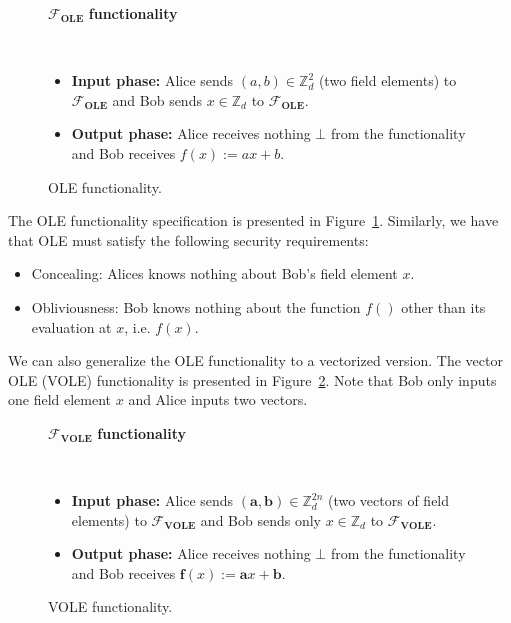 \begin{figure}[h!]
\centering
\begin{tcolorbox}
                        
    \centerline{$\mathcal{F}_{\textbf{OLE}}$ \textbf{functionality}}
            
    \
    
    \begin{itemize}
    		\item \textbf{Input phase:} Alice sends $(a,b)\in\mathbb{Z}_d^2$ (two field elements) to $\mathcal{F}_{\textbf{OLE}}$ and Bob sends $x\in\mathbb{Z}_d$ to $\mathcal{F}_{\textbf{OLE}}$.
    		\item \textbf{Output phase:} Alice receives nothing $\bot$ from the functionality and Bob receives $f(x):= ax + b$.
    \end{itemize}
    
\end{tcolorbox} 
    \caption{OLE functionality.}
    \label{fig:OLE_functionality}
\end{figure}

The OLE functionality specification is presented in Figure~\ref{fig:OLE_functionality}. Similarly, we have that OLE must satisfy the following security requirements:

\begin{itemize}
	\item Concealing: Alices knows nothing about Bob's field element $x$.
	\item Obliviousness: Bob knows nothing about the function $f()$ other than its evaluation at $x$, i.e. $f(x)$.
\end{itemize}

We can also generalize the OLE functionality to a vectorized version. The vector OLE (VOLE) functionality is presented in Figure~\ref{fig:VOLE_functionality}. Note that Bob only inputs one field element $x$ and Alice inputs two vectors. 


\begin{figure}[h!]
\centering
\begin{tcolorbox}
                        
    \centerline{$\mathcal{F}_{\textbf{VOLE}}$ \textbf{functionality}}
            
    \
    
    \begin{itemize}
    		\item \textbf{Input phase:} Alice sends $(\bm{a},\bm{b})\in\mathbb{Z}_d^{2n}$ (two vectors of field elements) to $\mathcal{F}_{\textbf{VOLE}}$ and Bob sends only $x\in\mathbb{Z}_d$ to $\mathcal{F}_{\textbf{VOLE}}$.
    		\item \textbf{Output phase:} Alice receives nothing $\bot$ from the functionality and Bob receives $\bm{f}(x):= \bm{a}x + \bm{b}$.
    \end{itemize}
    
\end{tcolorbox} 
    \caption{VOLE functionality.}
    \label{fig:VOLE_functionality}
\end{figure}


